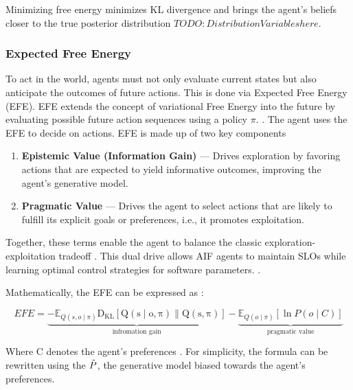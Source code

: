 
Minimizing free energy minimizes KL divergence and brings the agent’s beliefs closer to the true posterior distribution \(TODO: Distribution Variables here\). 






 \subsubsection{Expected Free Energy}
To act in the world, agents must not only evaluate current states but also anticipate the outcomes of future actions. This is done via Expected Free Energy (EFE). EFE extends the concept of variational Free Energy into the future by evaluating possible future action sequences using a policy \(\pi\). \cite{friston_active_2016}. The agent uses the EFE to decide on actions. EFE is made up of two key components \cite{friston_active_2022} %
\begin{enumerate}
  \item \textbf{Epistemic Value (Information Gain)} — Drives exploration by favoring actions that are expected to yield informative outcomes, improving the agent’s generative model.
  \item \textbf{Pragmatic Value} — Drives the agent to select actions that are likely to fulfill its explicit goals or preferences, i.e., it promotes exploitation.
\end{enumerate}

Together, these terms enable the agent to balance the classic exploration-exploitation tradeoff \cite{sedlak_adaptive_2024}. This dual drive allows AIF
agents to maintain SLOs while learning optimal control strategies for software parameters. \cite{lapkovskis_benchmarking_2025}.

Mathematically, the EFE can be expressed as \cite{parr_active_2022}:

\[
EFE=\underbrace{-\mathbb{E}_{Q(s, o \mid \pi)} \mathrm{D_{KL} \left[ Q(s \mid o, \pi) \parallel Q(s, \pi) \right] }}_{\text{infromation gain}} - \underbrace{\mathbb{E}_{Q(o \mid \pi)} \left[ \ln P(o \mid C) \right]}_{\text{pragmatic value}}
\]

Where C denotes the agent's preferences \cite{parr_active_2022}. For simplicity, the formula can be rewritten using the \(\Tilde{P}\), the generative model biased towards the agent's preferences.

